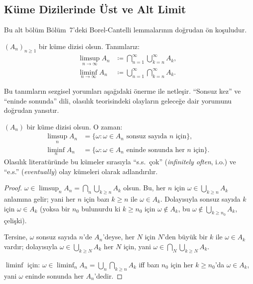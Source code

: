 \subsection{Küme Dizilerinde Üst ve Alt Limit}

Bu alt bölüm Bölüm~7'deki Borel-Cantelli lemmalarının doğrudan ön koşuludur.

\begin{tanim}\label{def:limsup_kume}
$(A_n)_{n \geq 1}$ bir küme dizisi olsun. Tanımlarız:
\begin{align*}
  \limsup_{n\to\infty} A_n
  &\coloneqq \bigcap_{n=1}^\infty \bigcup_{k=n}^\infty A_k, \\[4pt]
  \liminf_{n\to\infty} A_n
  &\coloneqq \bigcup_{n=1}^\infty \bigcap_{k=n}^\infty A_k.
\end{align*}
\end{tanim}

\begin{tanimgerekce}
Bu tanımların sezgisel yorumları aşağıdaki önerme ile netleşir.
``Sonsuz kez'' ve ``eninde sonunda'' dili, olasılık teorisindeki olayların
geleceğe dair yorumunu doğrudan yansıtır.
\end{tanimgerekce}

\begin{onerme}\label{prop:limsup_kume}
$(A_n)$ bir küme dizisi olsun. O zaman:
\begin{align*}
  \limsup_{n} A_n
  &= \{\omega : \omega \in A_n \text{ sonsuz sayıda } n \text{ için}\}, \\[4pt]
  \liminf_{n} A_n
  &= \{\omega : \omega \in A_n \text{ eninde sonunda her } n \text{ için}\}.
\end{align*}
Olasılık literatüründe bu kümeler sırasıyla ``s.s.~çok'' (\emph{infinitely often}, i.o.)
ve ``e.s.'' (\emph{eventually}) olay kümeleri olarak adlandırılır.
\end{onerme}

\begin{proof}
$\omega \in \limsup_n A_n = \bigcap_n \bigcup_{k \geq n} A_k$ olsun.
Bu, her $n$ için $\omega \in \bigcup_{k \geq n} A_k$ anlamına gelir; yani
her $n$ için bazı $k \geq n$ ile $\omega \in A_k$. Dolayısıyla sonsuz
sayıda $k$ için $\omega \in A_k$ (yoksa bir $n_0$ bulunurdu ki $k \geq n_0$
için $\omega \notin A_k$, bu $\omega \notin \bigcup_{k \geq n_0} A_k$,
çelişki).

Tersine, $\omega$ sonsuz sayıda $n$'de $A_n$'deyse, her $N$ için $N$'den büyük
bir $k$ ile $\omega \in A_k$ vardır; dolayısıyla $\omega \in \bigcup_{k \geq N} A_k$
her $N$ için, yani $\omega \in \bigcap_N \bigcup_{k \geq N} A_k$.

\medskip

$\liminf$ için: $\omega \in \liminf_n A_n = \bigcup_n \bigcap_{k \geq n} A_k$
iff bazı $n_0$ için her $k \geq n_0$'da $\omega \in A_k$,
yani $\omega$ eninde sonunda her $A_n$'dedir.
\end{proof}

